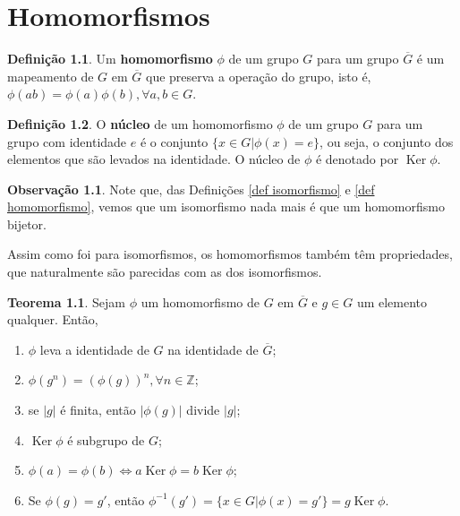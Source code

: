 \documentclass[a4paper,portuguese,11pt,twoside, leqno]{book}
\DeclareMathOperator{\Ker}{Ker}
\theoremstyle{definition}
\newtheorem{theorem}{Teorema}[section]
\newtheorem{remark}{Observação}[section]
\newtheorem{deff}{Definição}[section]
\begin{document}
	
	\chapter{Homomorfismos}
	\begin{deff}
		\label{def homomorfismo}
		Um \textbf{homomorfismo} $\phi$ de um grupo $G$ para um grupo $\overline{G}$ é um mapeamento de $G$ em $\overline{G}$ que preserva a operação do grupo, isto é, $\phi(ab) = \phi(a)\phi(b), \forall a,b\in G$.
	\end{deff}
	
	\begin{deff}
		\label{def nucleo}
		O \textbf{núcleo} de um homomorfismo $\phi$ de um grupo $G$ para um grupo com identidade $e$ é o conjunto $\{ x\in G | \phi(x) = e \}$, ou seja, o conjunto dos elementos que são levados na identidade. O núcleo de $\phi$ é denotado por $\Ker\phi$.
	\end{deff}
	
	\begin{remark}
		Note que, das Definições \eqref{def isomorfismo} e \eqref{def homomorfismo}, vemos que um isomorfismo nada mais é que um homomorfismo bijetor.
	\end{remark}
	\par\vspace{0.3cm} Assim como foi para isomorfismos, os homomorfismos também têm propriedades, que naturalmente são parecidas com as dos isomorfismos.
	\begin{theorem}
		\label{homomorfismos em elementos}
		Sejam $\phi$ um homomorfismo de $G$ em $\overline{G}$ e $g\in G$ um elemento qualquer. Então, 
		\begin{enumerate}
			\item $\phi$ leva a identidade de $G$ na identidade de $\overline{G}$;
			\item $\phi(g^n) = (\phi(g))^n, \forall n\in \mathbb{Z}$;
			\item se $|g|$ é finita, então $|\phi(g)|$ divide $|g|$;
			\item $\Ker\phi$ é subgrupo de $G$;
			\item $\phi(a) = \phi(b) \Leftrightarrow a\Ker\phi = b\Ker\phi$;
			\item Se $\phi(g) = g'$, então $\phi^{-1}(g') = \{ x\in G | \phi(x) = g' \} = g\Ker\phi$.
		\end{enumerate}
	\end{theorem}
	
\end{document}
